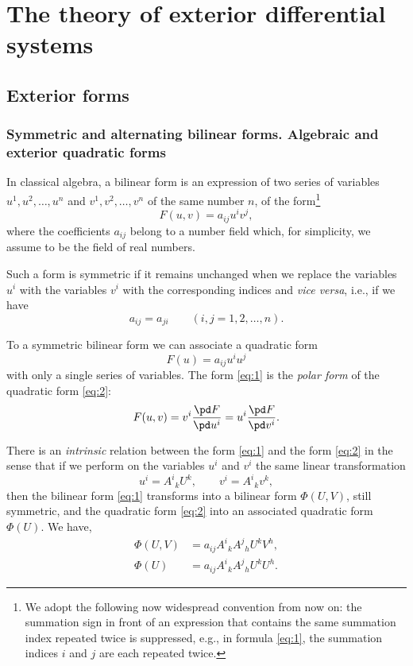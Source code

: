 
\part{The theory of exterior differential systems}
\label{part:theory-exter-diff}

\chapter{Exterior forms}
\label{cha:exterior-forms}

\section{Symmetric and alternating bilinear forms. Algebraic and exterior quadratic forms}
\label{sec:symm-altern-bilin}

\fsec In classical algebra,  a bilinear form  is an expression of two series of variables $u^{1}, u^{2}, \dots, u^{n}$ and $v^{1}, v^{2}, \dots, v^{n}$ of the same number $n$, of the form\footnote{We adopt the following now widespread convention from now on:  the summation sign in front of an expression that contains the same summation index repeated twice is suppressed, {e.g.}, in formula \eqref{eq:1},  the summation indices $i$ and $j$ are each repeated twice.}
\begin{equation}
  \label{eq:1}  
F(u,v)=a_{ij}u^{i}v^{j},
\end{equation}
where the coefficients $a_{ij}$ belong to a number field which, for simplicity, we assume to be the field of real numbers.

Such a form is  symmetric  if it remains unchanged when we replace the variables $u^{i}$ with the variables $v^{i}$ with the corresponding indices and \emph{vice versa}, {i.e.}, if we have
\[
a_{ij}=a_{ji}\qquad(i,j=1,2,\dots,n).
\]

To a symmetric bilinear form we can associate a quadratic form 
\begin{equation}
  \label{eq:2}
  F(u)=a_{ij}u^{i}u^{j}
\end{equation}
with only a single series of variables. The form \eqref{eq:1} is the \emph{polar form}  of the quadratic form \eqref{eq:2}:
\[
F(u,v)=v^{i}\frac{\pd F}{\pd u^{i}}=u^{i}\frac{\pd F}{\pd v^{i}}.
\]

There is an \emph{intrinsic} relation between the form \eqref{eq:1} and the form \eqref{eq:2} in the sense that if we perform on the variables $u^{i}$ and $v^{i}$ the same linear transformation
\[
u^{i}=A^{i}{}_{k}U^{k},\qquad v^{i}=A^{i}{}_{k}v^{k},
\] 
then the bilinear form \eqref{eq:1} transforms into a bilinear form $\Phi(U,V)$, still symmetric, and the quadratic form \eqref{eq:2} into an associated quadratic form $\Phi(U)$. We have,
\begin{align*}
\Phi(U,V)&=a_{ij}A^{i}{}_{k}A^{j}{}_{h}U^{k}V^{h},\\
\Phi(U)&=a_{ij}A^{i}{}_{k}A^{j}{}_{h}U^{k}U^{h}.
\end{align*}

